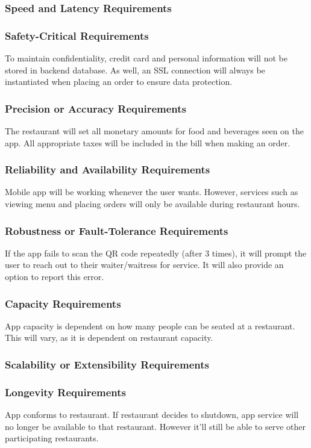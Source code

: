 \documentclass[12pt, titlepage]{article}
\begin{document}
\subsubsection{Speed and Latency Requirements}

\subsubsection{Safety-Critical Requirements}
To maintain confidentiality, credit card and personal information will not be stored in backend database. As well, an SSL connection will always be instantiated when placing an order to ensure data protection. 
\subsubsection{Precision or Accuracy Requirements}
The restaurant will set all monetary amounts for food and beverages seen on the app. All appropriate taxes will be included in the bill when making an order.  
\subsubsection{Reliability and Availability Requirements}
Mobile app will be working whenever the user wants. However, services such as viewing menu and placing orders will only be available during restaurant hours.
\subsubsection{Robustness or Fault-Tolerance Requirements}
If the app fails to scan the QR code repeatedly (after 3 times), it will prompt the user to reach out to their waiter/waitress for service. It will also provide an option to report this error.
\subsubsection{Capacity Requirements}
App capacity is dependent on how many people can be seated at a restaurant. This will vary, as it is dependent on restaurant capacity. 
\subsubsection{Scalability or Extensibility Requirements}

\subsubsection{Longevity Requirements}
App conforms to restaurant. If restaurant decides to shutdown, app service will no longer be available to that restaurant. However it’ll still be able to serve other participating restaurants.
\end{document}

